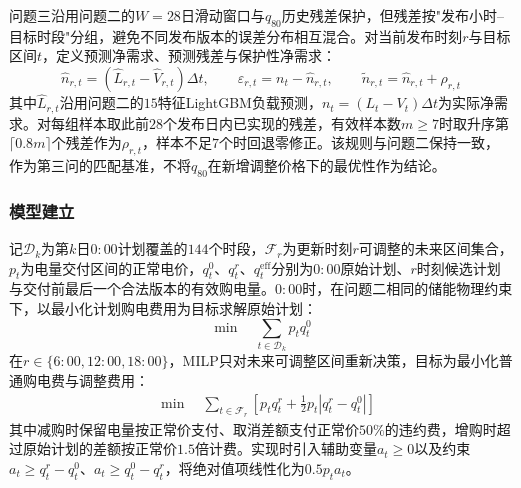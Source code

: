 \documentclass[12pt,a4paper]{ctexart}
\theoremstyle{definition}
\theoremstyle{plain}
\theoremstyle{remark}
\begin{document}
问题三沿用问题二的$W=28$日滑动窗口与$q_{80}$历史残差保护，但残差按"发布小时--目标时段"分组，避免不同发布版本的误差分布相互混合。对当前发布时刻$r$与目标区间$t$，定义预测净需求、预测残差与保护性净需求：
\begin{equation}
  \widehat{n}_{r,t} = (\widehat{L}_{r,t} - \widehat{V}_{r,t})\Delta t, \qquad
  \varepsilon_{r,t} = n_t - \widehat{n}_{r,t}, \qquad
  \widetilde{n}_{r,t} = \widehat{n}_{r,t} + \rho_{r,t}
  \label{eq:q3_protected}
\end{equation}
\noindent 其中$\widehat{L}_{r,t}$沿用问题二的$15$特征LightGBM负载预测，$n_t=(L_t-V_t)\Delta t$为实际净需求。对每组样本取此前$28$个发布日内已实现的残差，有效样本数$m\geq7$时取升序第$\lceil0.8m\rceil$个残差作为$\rho_{r,t}$，样本不足$7$个时回退零修正。该规则与问题二保持一致，作为第三问的匹配基准，不将$q_{80}$在新增调整价格下的最优性作为结论。

\subsubsection{模型建立}

记$\mathcal{D}_k$为第$k$日$0{:}00$计划覆盖的$144$个时段，$\mathcal{F}_r$为更新时刻$r$可调整的未来区间集合，$p_t$为电量交付区间的正常电价，$q_t^{0}$、$q_t^{r}$、$q_t^{\mathrm{eff}}$分别为$0{:}00$原始计划、$r$时刻候选计划与交付前最后一个合法版本的有效购电量。$0{:}00$时，在问题二相同的储能物理约束下，以最小化计划购电费用为目标求解原始计划：
\begin{equation}
  \boxed{\min \quad \sum_{t\in\mathcal{D}_k} p_t q_t^{0}}
  \label{eq:q3_obj0}
\end{equation}
\noindent 在$r\in\{6{:}00,12{:}00,18{:}00\}$，MILP只对未来可调整区间重新决策，目标为最小化普通购电费与调整费用：
\begin{equation}
  \boxed{\begin{aligned}
  & \min \quad \sum_{t\in\mathcal{F}_r}
  \left[ p_t q_t^{r} + \frac{1}{2} p_t \left| q_t^{r} - q_t^{0} \right| \right]
  \end{aligned}}
  \label{eq:q3_obj_r}
\end{equation}
\noindent 其中减购时保留电量按正常价支付、取消差额支付正常价$50\%$的违约费，增购时超过原始计划的差额按正常价$1.5$倍计费。实现时引入辅助变量$a_t\geq0$以及约束$a_t\geq q_t^{r}-q_t^{0}$、$a_t\geq q_t^{0}-q_t^{r}$，将绝对值项线性化为$0.5p_ta_t$。
\end{document}
